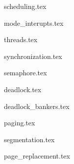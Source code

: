 
{scheduling.tex}           \newpage

{mode_interupts.tex}       \newpage

{threads.tex}              \newpage

{synchronization.tex}      \newpage

{semaphore.tex}            \newpage

{deadlock.tex}            \newpage

{deadlock_bankers.tex}    \newpage

{paging.tex}              \newpage

{segmentation.tex}        \newpage

{page_replacement.tex}    \newpage
